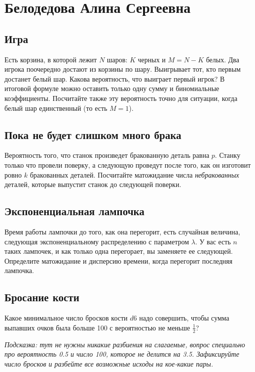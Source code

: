 \documentclass[12pt]{article}
\begin{document}

\section{Белодедова Алина Сергеевна}

\subsection{Игра}
Есть корзина, в которой лежит $N$ шаров: $K$ черных и $M = N - K$ белых. Два игрока поочередно достают из корзины по шару. Выигрывает тот, кто первым достанет белый шар. Какова вероятность, что выиграет первый игрок? В итоговой формуле можно оставить только одну сумму и биномиальные коэффициенты. Посчитайте также эту вероятность точно для ситуации, когда белый шар единственный (то есть $M = 1$).

\subsection{Пока не будет слишком много брака}
Вероятность того, что станок произведет бракованную деталь равна $p$. Станку только что провели поверку, а следующую проведут после того, как он изготовит ровно $k$ бракованных деталей. Посчитайте матожидание числа \emph{небракованных} деталей, которые выпустит станок до следующей поверки.

\subsection{Экспоненциальная лампочка}
Время работы лампочки до того, как она перегорит, есть случайная величина, следующая экспоненциальному распределению с параметром $\lambda$. У вас есть $n$ таких лампочек, и как только одна перегорает, вы заменяете ее следующей. Определите матожидание и дисперсию времени, когда перегорит последняя лампочка.

\subsection{Бросание кости}
Какое минимальное число бросков кости $d6$ надо совершить, чтобы сумма выпавших очков была больше 100 с вероятностью не меньше $\frac{1}{2}$? 

\emph{Подсказка: тут не нужны никакие разбиения на слагаемые, вопрос специально про вероятность 0.5 и число 100, которое не делится на 3.5. Зафиксируйте число бросков и разбейте все возможные исходы на кое-какие пары.}
\end{document}
